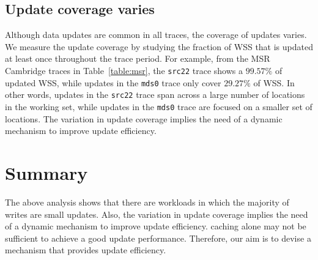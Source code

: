 \subsection{Update coverage varies} Although data updates are common in all
traces, the coverage of updates varies. %
We measure the update coverage by studying the fraction of WSS that is updated
at least once throughout the trace period. For example, from the MSR Cambridge
traces in Table~\ref{table:msr}, the \texttt{src22} trace shows a $99.57\%$ of
updated WSS, while updates in the \texttt{mds0} trace only cover $29.27\%$ of
WSS. In other words, updates in the \texttt{src22} trace span across a large
number of locations in the working set, while updates in the \texttt{mds0}
trace are focused on a smaller set of locations.  The variation in update
coverage implies the need of a dynamic mechanism to improve update efficiency.


\section{Summary}
The above analysis shows that there are workloads in which the majority of
writes are small updates. Also, the variation in update coverage implies the
need of a dynamic mechanism to improve update efficiency.
caching alone may not be sufficient to achieve a good update performance.
Therefore, our aim is to devise a mechanism that provides update efficiency. 
